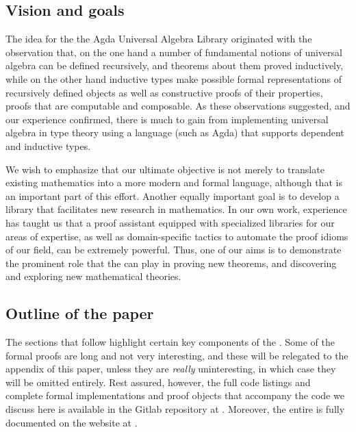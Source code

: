 \documentclass[a4paper,USenglish,cleveref,autoref,thm-restate]{lipics-v2019}
\begin{document}
\subsection{Vision and goals}\label{vision-and-goals}
The idea for the the Agda Universal Algebra Library originated with the observation that, on the one hand a number of fundamental notions of universal algebra can be defined recursively, and theorems about them proved inductively, while on the other hand inductive types make possible formal representations of recursively defined objects as well as constructive proofs of their properties, proofs that are computable and composable. As these observations suggested, and our experience confirmed, there is much to gain from implementing universal algebra in type theory using a language (such as Agda) that supports dependent and inductive types.

We wish to emphasize that our ultimate objective is not merely to translate existing mathematics into a more modern and formal language, although that is an important part of this effort.  Another equally important goal is to develop a library that facilitates new research in mathematics. In our own work, experience has taught us that a proof assistant equipped with specialized libraries for our areas of expertise, as well as domain-specific tactics to automate the proof idioms of our field, can be extremely powerful.  Thus, one of our aims is to demonstrate the prominent role that the \agdaualib can play in proving new theorems, and discovering and exploring new mathematical theories.

\subsection{Outline of the paper}
The sections that follow highlight certain key components of the \agdaualib. Some of the formal proofs are long and not very interesting, and these will be relegated to the appendix of this paper, unless they are \emph{really} uninteresting, in which case they will be omitted entirely.  Rest assured, however, the full code listings and complete formal implementations and proof objects that accompany the code we discuss here is available in the \agdaualib Gitlab repository at \ualibgitlabio.  Moreover, the entire \agdaualib is fully documented on the website at \agdaualibdoc.
\end{document}
